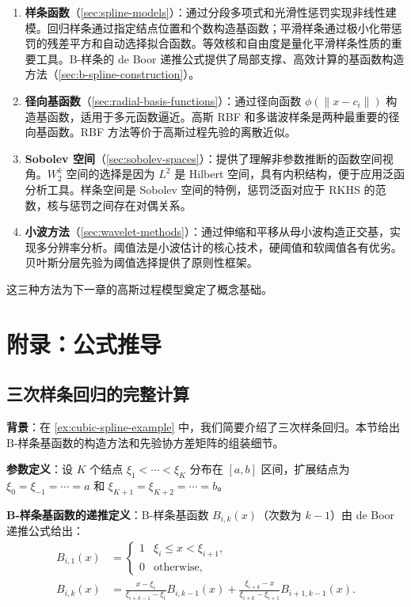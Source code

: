 \begin{enumerate}
\item \textbf{样条函数}（\cref{sec:spline-models}）：通过分段多项式和光滑性惩罚实现非线性建模。回归样条通过指定结点位置和个数构造基函数；平滑样条通过极小化带惩罚的残差平方和自动选择拟合函数。等效核和自由度是量化平滑样条性质的重要工具。B-样条的 de Boor 递推公式提供了局部支撑、高效计算的基函数构造方法（\cref{sec:b-spline-construction}）。
\item \textbf{径向基函数}（\cref{sec:radial-basis-functions}）：通过径向函数 $\phi(\|x - c_i\|)$ 构造基函数，适用于多元函数逼近。高斯 RBF 和多谐波样条是两种最重要的径向基函数。RBF 方法等价于高斯过程先验的离散近似。
\item \textbf{Sobolev 空间}（\cref{sec:sobolev-spaces}）：提供了理解非参数推断的函数空间视角。$W_2^k$ 空间的选择是因为 $L^2$ 是 Hilbert 空间，具有内积结构，便于应用泛函分析工具。样条空间是 Sobolev 空间的特例，惩罚泛函对应于 RKHS 的范数，核与惩罚之间存在对偶关系。
\item \textbf{小波方法}（\cref{sec:wavelet-methods}）：通过伸缩和平移从母小波构造正交基，实现多分辨率分析。阈值法是小波估计的核心技术，硬阈值和软阈值各有优劣。贝叶斯分层先验为阈值选择提供了原则性框架。
\end{enumerate}

这三种方法为下一章的高斯过程模型奠定了概念基础。

\section{附录：公式推导}\label{sec:appendix-chapter20}

\subsection{三次样条回归的完整计算}\label{sec:derivation-cubic-spline}

\textbf{背景}：在 \cref{ex:cubic-spline-example} 中，我们简要介绍了三次样条回归。本节给出 B-样条基函数的构造方法和先验协方差矩阵的组装细节。

\textbf{参数定义}：设 $K$ 个结点 $\xi_1 < \cdots < \xi_K$ 分布在 $[a, b]$ 区间，扩展结点为 $\xi_0 = \xi_{-1} = \cdots = a$ 和 $\xi_{K+1} = \xi_{K+2} = \cdots = b$。

\textbf{B-样条基函数的递推定义}：B-样条基函数 $B_{i,k}(x)$（次数为 $k-1$）由 de Boor 递推公式给出：
\begin{align}
B_{i,1}(x) &= \begin{cases} 1 & \xi_i \leq x < \xi_{i+1}, \\ 0 & \text{otherwise}, \end{cases} \label{eq:de-boor-base} \\
B_{i,k}(x) &= \frac{x - \xi_i}{\xi_{i+k-1} - \xi_i} B_{i,k-1}(x) + \frac{\xi_{i+k} - x}{\xi_{i+k} - \xi_{i+1}} B_{i+1,k-1}(x). \label{eq:de-boor-recursion}
\end{align}

